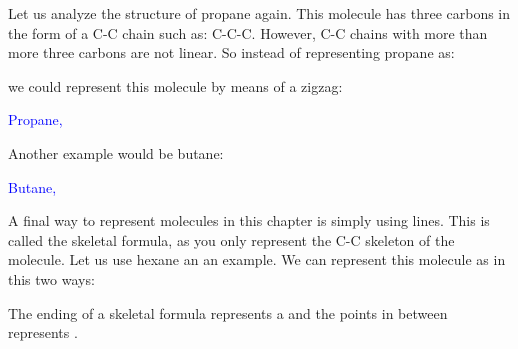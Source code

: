 \documentclass[main.tex]{subfiles}
\begin{document}
\begin{description}
\begin{example}
\begin{flushright}
 \end{flushright}

\end{example}%






\item[\docfilehook{  ZigZag}{ZigZag}] Let us analyze the structure of propane again. This molecule has three carbons in the form of a C-C chain such as: C-C-C. However, C-C chains with more than more three carbons are not linear. So instead of representing propane as:
\begin{center} \end{center}
we could represent this molecule by means of a zigzag:

\begin{center} \hspace{0.5cm}\textcolor{blue}{Propane, }\end{center}
Another example would be butane:
\begin{center} \hspace{0.5cm}\textcolor{blue}{Butane, }\end{center}

\item[\docfilehook{  Skeletal formula}{Skeletal formula}] A final way to represent molecules in this chapter is simply using lines. This is called the skeletal formula, as you only represent the C-C skeleton of the molecule. Let us use hexane an an example. We can represent this molecule as in this two ways:
\begin{center}\end{center}
The ending of a skeletal formula represents a  and the points in between represents . 


\end{description}
\end{document}
